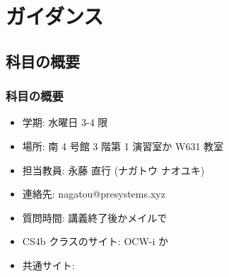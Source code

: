 \section{ガイダンス}
%
%
\subsection{科目の概要}
\begin{frame}
\frametitle{科目の概要}
  \begin{itemize}
\item 学期: 水曜日 3-4 限
\item 場所: 南 4 号館 3 階第 1 演習室か W631 教室
\item 担当教員: 永藤 直行 (ナガトウ ナオユキ)
\item 連絡先: nagatou@presystems.xyz
\item 質問時間: 講義終了後かメイルで
\item CS4b クラスのサイト: OCW-i か \href{https://sites.google.com/a/presystems.xyz/sample/home/elementary-computer-science}{} 
\item 共通サイト: \href{http://www.is.c.titech.ac.jp/~is0000_kashima/CSpublic/3Q.html}{} 
  \end{itemize}
\end{frame}
%
%
%
%
